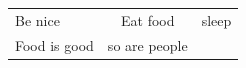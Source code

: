 \documentclass[landscape]{article}
\begin{document}
	\begin{table}
		\begin{tabular}{l| c | r}
			Be nice & Eat food & sleep\\
			Food is good & so are people
		\end{tabular}
	\end{table}

	

	
\end{document}
